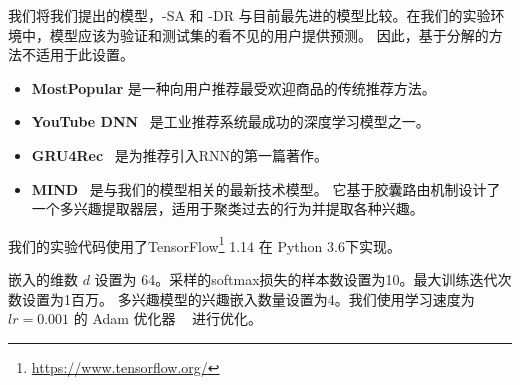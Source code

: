  我们将我们提出的模型，\model-SA 和 \model-DR 与目前最先进的模型比较。在我们的实验环境中，模型应该为验证和测试集的看不见的用户提供预测。 因此，基于分解的方法不适用于此设置。
\begin{itemize}
    \item \textbf{MostPopular} 是一种向用户推荐最受欢迎商品的传统推荐方法。
    \item \textbf{YouTube DNN}~\cite{covington2016deep} 是工业推荐系统最成功的深度学习模型之一。
    \item \textbf{GRU4Rec}~\cite{hidasi2015session} 是为推荐引入RNN的第一篇著作。
    \item \textbf{MIND}~\cite{li2019multi} 是与我们的模型相关的最新技术模型。 它基于胶囊路由机制设计了一个多兴趣提取器层，适用于聚类过去的行为并提取各种兴趣。
\end{itemize}

我们的实验代码使用了TensorFlow\footnote{\url{https://www.tensorflow.org/}} 1.14 在 Python 3.6下实现。 %

嵌入的维数 $d$ 设置为 64。采样的softmax损失的样本数设置为10。最大训练迭代次数设置为1百万。 多兴趣模型的兴趣嵌入数量设置为4。我们使用学习速度为 $lr=0.001$ 的 Adam 优化器 ~\cite{kingma2014adam} 进行优化。

